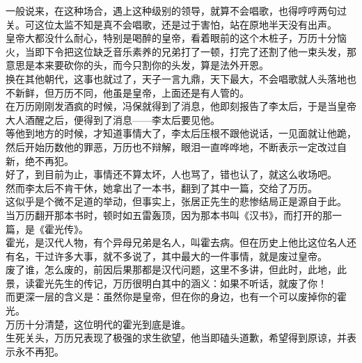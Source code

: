 \begin{multicols}{\theparacolNo}
一般说来，在这种场合，遇上这种级别的领导，就算不会唱歌，也得哼哼两句过关。可这位太监不知是真不会唱歌，还是过于害怕，站在原地半天没有出声。\\

皇帝大都没什么耐心，特别是喝醉的皇帝，看着眼前的这个木桩子，万历十分恼火，当即下令把这位缺乏音乐素养的兄弟打了一顿，打完了还割了他一束头发，那意思是本来要砍你的头，而今只割你的头发，算是法外开恩。\\

换在其他朝代，这事也就过了，天子一言九鼎，天下最大，不会唱歌就人头落地也不新鲜，但万历不同，他虽是皇帝，上面还是有人管的。\\

在万历刚刚发酒疯的时候，冯保就得到了消息，他即刻报告了李太后，于是当皇帝大人酒醒之后，便得到了消息——李太后要见他。\\

等他到地方的时候，才知道事情大了，李太后压根不跟他说话，一见面就让他跪，然后开始历数他的罪恶，万历也不辩解，眼泪一直哗哗地，不断表示一定改过自新，绝不再犯。\\

好了，到目前为止，事情还不算太坏，人也骂了，错也认了，就这么收场吧。\\

然而李太后不肯干休，她拿出了一本书，翻到了其中一篇，交给了万历。\\

这似乎是个微不足道的举动，但事实上，张居正先生的悲惨结局正是源自于此。\\

当万历翻开那本书时，顿时如五雷轰顶，因为那本书叫《汉书》，而打开的那一篇，是《霍光传》。\\

霍光，是汉代人物，有个异母兄弟是名人，叫霍去病。但在历史上他比这位名人还有名，干过许多大事，就不多说了，其中最大的一件事情，就是废过皇帝。\\

废了谁，怎么废的，前因后果那都是汉代问题，这里不多讲，但此时，此地，此景，读霍光先生的传记，万历很明白其中的涵义：如果不听话，就废了你！\\

而更深一层的含义是：虽然你是皇帝，但在你的身边，也有一个可以废掉你的霍光。\\

万历十分清楚，这位明代的霍光到底是谁。\\

生死关头，万历兄表现了极强的求生欲望，他当即磕头道歉，希望得到原谅，并表示永不再犯。\\


\end{multicols}
